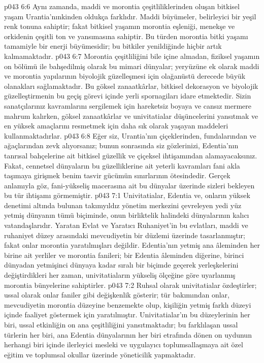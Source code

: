 \vs p043 6:6 Aynı zamanda, maddi ve morontia çeşitliliklerinden oluşan bitkisel yaşam Urantia’nınkinden oldukça farklıdır. Maddi büyümeler, belirleyici bir yeşil renk tonuna sahiptir; fakat bitkisel yaşamın morontia eşleniği, menekşe ve orkidenin çeşitli ton ve yansımasına sahiptir. Bu türden morontia bitki yaşamı tamamiyle bir enerji büyümesidir; bu bitkiler yenildiğinde hiçbir artık kalmamaktadır.
\vs p043 6:7 Morontia çeşitliliğini bile içine almadan, fiziksel yaşamın on bölümü ile bahşedilmiş olarak bu mimari dünyalar; yeryüzüne ek olarak maddi ve morontia yapılarının biyolojik güzelleşmesi için olağanüstü derecede büyük olanakları sağlamaktadır. Bu göksel zanaatkârlar, bitkisel dekorasyon ve biyolojik güzelleştirmenin bu geçiş görevi içinde yerli spornagiları idare etmektedir. Sizin sanatçılarınız kavramlarını sergilemek için hareketsiz boyaya ve cansız mermere mahrum kalırken, göksel zanaatkârlar ve univitatialar düşüncelerini yansıtmak ve en yüksek amaçlarını resmetmek için daha sık olarak yaşayan maddeleri kullanmaktadırlar.
\vs p043 6:8 Eğer siz, Urantia’nın çiçeklerinden, fundalarından ve ağaçlarından zevk alıyorsanız; bunun sonrasında siz gözlerinizi, Edentia’nın tanrısal bahçelerine ait bitkisel güzellik ve çiçeksel ihtişamından alamayacaksınız. Fakat, cennetsel dünyaların bu güzelliklerine ait yeterli kavramları fani akla taşımaya girişmek benim tasvir gücümün sınırlarının ötesindedir. Gerçek anlamıyla göz, fani\hyp{}yükseliş macerasına ait bu dünyalar üzerinde sizleri bekleyen bu tür ihtişamı görmemiştir.
\vs p043 7:1 Univitatialar, Edentia ve, onların yüksek denetimi altında bulunan takımyıldız yönetim merkezini çevreleyen yedi yüz yetmiş dünyanın tümü biçiminde, onun birliktelik halindeki dünyalarının kalıcı vatandaşlarıdır. Yaratan Evlat ve Yaratıcı Ruhaniyet’in bu evlatları, maddi ve ruhaniyet düzey arasındaki mevcudiyetin bir düzlemi üzerinde tasarlanmıştır; fakat onlar morontia yaratılmışları değildir. Edentia’nın yetmiş ana âleminden her birine ait yerliler ve morontia fanileri; bir Edentia âleminden diğerine, birinci dünyadan yetmişinci dünyaya kadar sıralı bir biçimde geçerek yerleşkelerini değiştirdikleri her zaman, univitatiaların yükseliş ölçeğine göre uyarlanmış morontia bünyelerine sahiptirler.
\vs p043 7:2 Ruhsal olarak univitatialar özdeştirler; ussal olarak onlar faniler gibi değişkenlik gösterir; tür bakımından onlar, mevcudiyetin morontia düzeyine benzemekte olup, kişiliğin yetmiş farklı düzeyi içinde faaliyet göstermek için yaratılmıştır. Univitatialar’ın bu düzeylerinin her biri, ussal etkinliğin on ana çeşitliliğini yansıtmaktadır; bu farklılaşan ussal türlerin her biri, ana Edentia dünyalarının her biri etrafında dönen on uydunun herhangi biri içinde ilerleyici mesleki ve uygulayıcı toplumsallaşmaya ait özel eğitim ve toplumsal okullar üzerinde yöneticilik yapmaktadır.
